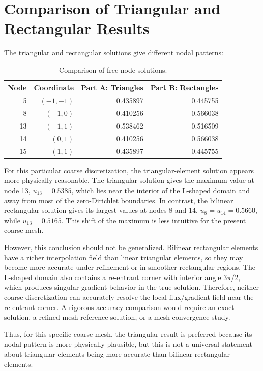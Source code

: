\documentclass[14pt,a4paper]{article}
\begin{document}
\section{Comparison of Triangular and Rectangular Results}

The triangular and rectangular solutions give different nodal patterns:
\begin{table}[H]
\centering
\caption{Comparison of free-node solutions.}
\begin{tabular}{rrrr}
\toprule
Node & Coordinate & Part A: Triangles & Part B: Rectangles \\
\midrule
5  & $(-1,-1)$ & 0.435897 & 0.445755 \\
8  & $(-1,0)$  & 0.410256 & 0.566038 \\
13 & $(-1,1)$  & 0.538462 & 0.516509 \\
14 & $(0,1)$   & 0.410256 & 0.566038 \\
15 & $(1,1)$   & 0.435897 & 0.445755 \\
\bottomrule
\end{tabular}
\end{table}

For this particular coarse discretization, the triangular-element solution appears more physically reasonable. The triangular solution gives the maximum value at node 13, \(u_{13}=0.5385\), which lies near the interior of the L-shaped domain and away from most of the zero-Dirichlet boundaries. In contrast, the bilinear rectangular solution gives its largest values at nodes 8 and 14, \(u_8=u_{14}=0.5660\), while \(u_{13}=0.5165\). This shift of the maximum is less intuitive for the present coarse mesh.

However, this conclusion should not be generalized. Bilinear rectangular elements have a richer interpolation field than linear triangular elements, so they may become more accurate under refinement or in smoother rectangular regions. The L-shaped domain also contains a re-entrant corner with interior angle \(3\pi/2\), which produces singular gradient behavior in the true solution. Therefore, neither coarse discretization can accurately resolve the local flux/gradient field near the re-entrant corner. A rigorous accuracy comparison would require an exact solution, a refined-mesh reference solution, or a mesh-convergence study.

Thus, for this specific coarse mesh, the triangular result is preferred because its nodal pattern is more physically plausible, but this is not a universal statement about triangular elements being more accurate than bilinear rectangular elements.
\end{document}
